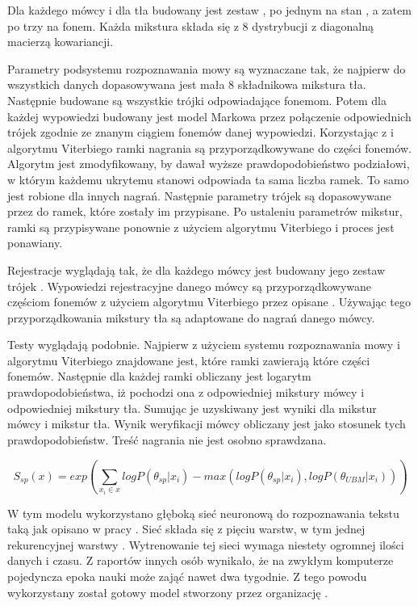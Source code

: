 Dla każdego mówcy i dla tła budowany jest zestaw , po jednym na stan ,
a zatem po trzy na fonem. Każda mikstura składa się z $8$ dystrybucji z diagonalną macierzą kowariancji.

Parametry podsystemu rozpoznawania mowy są wyznaczane tak, że najpierw do wszystkich danych
dopasowywana jest mała 8 składnikowa mikstura tła. Następnie budowane są wszystkie trójki 
odpowiadające fonemom. Potem dla każdej wypowiedzi budowany jest model Markowa przez połączenie odpowiednich
trójek zgodnie ze znanym ciągiem fonemów danej wypowiedzi. Korzystając z  i algorytmu Viterbiego
ramki nagrania są przyporządkowywane do części fonemów. Algorytm jest zmodyfikowany, by dawał wyższe prawdopodobieństwo
podziałowi, w którym każdemu ukrytemu stanowi odpowiada ta sama liczba ramek. To samo jest robione dla innych nagrań.
Następnie parametry trójek  są dopasowywane przez  do ramek, które zostały im przypisane.
Po ustaleniu parametrów mikstur, ramki są przypisywane ponownie z użyciem algorytmu Viterbiego i proces jest ponawiany.

Rejestracje wyglądają tak, że dla każdego mówcy jest budowany jego zestaw trójek .
Wypowiedzi rejestracyjne danego mówcy są przyporządkowywane
częściom fonemów z użyciem algorytmu Viterbiego przez opisane .
Używając tego przyporządkowania mikstury tła są  adaptowane do nagrań danego mówcy.

Testy wyglądają podobnie. Najpierw z użyciem systemu rozpoznawania mowy i algorytmu Viterbiego znajdowane
jest, które ramki zawierają które części fonemów. Następnie dla każdej ramki obliczany jest logarytm prawdopodobieństwa,
iż pochodzi ona z odpowiedniej mikstury mówcy i odpowiedniej mikstury tła. Sumując je uzyskiwany jest wyniki dla mikstur
mówcy i mikstur tła. Wynik weryfikacji mówcy obliczany jest jako stosunek tych prawdopodobieństw. Treść
nagrania nie jest osobno sprawdzana.

$$S_{sp}(x) = exp(\sum_{x_i \in x} log P(\theta_{sp} | x_i) - max(log P(\theta_{sp} | x_i), log P(\theta_{UBM} | x_i)))$$

\label{sec:dnn_gmm}

W tym modelu wykorzystano głęboką sieć neuronową do rozpoznawania tekstu taką jak opisano w pracy \cite{endToEnd}.
Sieć składa się z pięciu warstw, w tym jednej rekurencyjnej warstwy .
Wytrenowanie tej sieci wymaga niestety ogromnej ilości danych i czasu. Z raportów innych osób wynikało, że na
zwykłym komputerze pojedyncza epoka nauki może zająć nawet dwa tygodnie. Z tego powodu wykorzystany został
gotowy model stworzony przez organizację .

